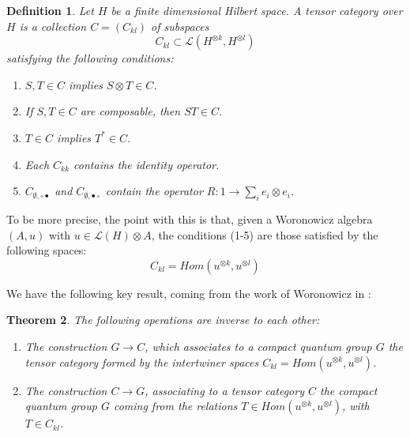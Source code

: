 \documentclass[12pt]{amsbook}
\newtheorem{theorem}{Theorem}[chapter]
\newtheorem{definition}[theorem]{Definition}
\begin{document}
\begin{definition}
Let $H$ be a finite dimensional Hilbert space. A tensor category over $H$ is a collection $C=(C_{kl})$ of subspaces 
$$C_{kl}\subset\mathcal L(H^{\otimes k},H^{\otimes l})$$
satisfying the following conditions:
\begin{enumerate}
\item $S,T\in C$ implies $S\otimes T\in C$.

\item If $S,T\in C$ are composable, then $ST\in C$.

\item $T\in C$ implies $T^*\in C$.

\item Each $C_{kk}$ contains the identity operator.

\item $C_{\emptyset,\circ\bullet}$ and $C_{\emptyset,\bullet\circ}$ contain the operator $R:1\to\sum_ie_i\otimes e_i$.
\end{enumerate}
\end{definition}

To be more precise, the point with this is that, given a Woronowicz algebra $(A,u)$ with $u\in\mathcal L(H)\otimes A$, the conditions (1-5) are those satisfied by the following spaces:
$$C_{kl}=Hom(u^{\otimes k},u^{\otimes l})$$

We have the following key result, coming from the work of Woronowicz in \cite{wo2}:


\begin{theorem}
The following operations are inverse to each other:
\begin{enumerate}
\item The construction $G\to C$, which associates to a compact quantum group $G$ the tensor category formed by the intertwiner spaces $C_{kl}=Hom(u^{\otimes k},u^{\otimes l})$.

\item The construction $C\to G$, associating to a tensor category $C$ the compact quantum group $G$ coming from the relations $T\in Hom(u^{\otimes k},u^{\otimes l})$, with $T\in C_{kl}$.
\end{enumerate}
\end{theorem}
\end{document}
